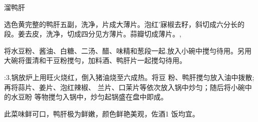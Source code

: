 \begin{recipe}{溜鸭肝}

\ingredients


\cooking

\step 选色黄完整的鸭肝五副，洗净，片成大薄片。泡红’寐椒去籽，斜切成六分长的段。姜去皮，洗净，切成四分见方薄片。蒜瓣切成薄片。,

\step 将水豆粉、酱油、白糖、二汤、醋、味精和葱段一起.放入小碗中搅勻待用。另用大碗将蛋清和干豆粉搅勻，加料酒、鸭肝片一起搅勾待用。

:3,锅放炉上用旺火烧红，倒入猪油烧至六成热。将豆 粉、鸭肝搅匀放入油中拨散;再将蒜片、姜片、泡红辣椒、 兰片、口茉片等依次放入锅中炒匀；随后将小碗中的水豆盼 等物搅匀入锅中，炒匀起锅盛在盘中即成。

\notes

此菜味鲜可口，鸭肝极为鲜嫩，颜色鲜艳美观，佐酒1 饭均宜。

\end{recipe}

